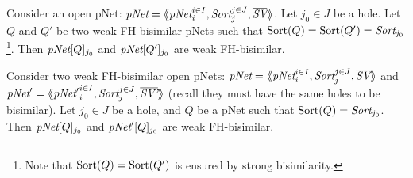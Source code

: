 \documentclass{lncs/llncs}
\newcommand{\TODO}[1]{\textcolor{red}{\textbf{[TODO:#1]}}}
\begin{document}

\begin{theorem}\label{weak-thm-congr-eq}
	Consider an open pNet:
	$\pNet = \mylangle \pNet_i^{i\in I}, \Sort_j^{j\in J}, 
	\overline{\symb{SV}}\myrangle$.
	Let $j_0\in J$ be a hole. Let $Q$ and $Q'$ be two weak FH-bisimilar pNets such that 
	$\Sortop(Q)=\Sortop(Q')=\Sort_{j_0}$\footnote{Note that $\operatorname{Sort}(Q)=\operatorname{Sort}(Q')$ is 
	ensured by 
	strong bisimilarity.}. Then 
	$\pNet[Q]_{j_0}$ and 
	$\pNet[Q']_{j_0}$ are weak FH-bisimilar.
\end{theorem}

\begin{theorem}\label{weak-thm-ctxt-eq}
	Consider two weak FH-bisimilar open pNets:
	$\pNet = \mylangle \pNet_i^{i\in I}, \Sort_j^{j\in J}, 
	\overline{\symb{SV}}\myrangle$ and 	$\pNet' = \mylangle {\pNet'}_i^{i\in I}, 
	\Sort_j^{j\in 
	J}, 	\overline{\symb{SV'}}\myrangle$ 
	(recall they must have the same holes to be bisimilar).
	Let $j_0\in J$ be a hole, and $Q$ be a pNet such that $\Sortop(Q)=\Sort_{j_0}$. Then 
	$\pNet[Q]_{j_0}$ and 
	$\pNet'[Q]_{j_0}$ are weak FH-bisimilar.
\end{theorem}
\end{document}
